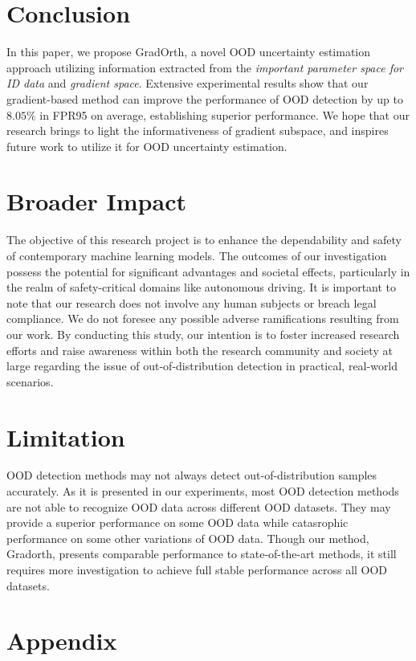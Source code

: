 \documentclass{article}
\begin{document}
\section{Conclusion}\vspace{-3mm}
In this paper, we propose GradOrth, a novel OOD uncertainty estimation approach utilizing information extracted from the \textit{important parameter space for ID data} and \textit{gradient space}. 
Extensive experimental results show that our gradient-based method can improve the performance of OOD detection by up to  $8.05\%$ in FPR95 on average, establishing superior performance. 
We hope that our research brings to light the informativeness of gradient subspace, and inspires future work to utilize it for OOD uncertainty estimation.
\newpage


\newpage
\section*{Broader Impact}
  The objective of this research project is to enhance the dependability and safety of contemporary machine learning models. The outcomes of our investigation possess the potential for significant advantages and societal effects, particularly in the realm of safety-critical domains like autonomous driving. It is important to note that our research does not involve any human subjects or breach legal compliance. We do not foresee any possible adverse ramifications resulting from our work. By conducting this study, our intention is to foster increased research efforts and raise awareness within both the research community and society at large regarding the issue of out-of-distribution detection in practical, real-world scenarios.

\section*{Limitation}
OOD detection methods may not always detect out-of-distribution samples accurately.
As it is presented in our experiments, most OOD detection methods are not able to recognize OOD data across different OOD datasets. They may provide a superior performance on some OOD data while catasrophic performance on some other variations of OOD data. Though our method, Gradorth, presents comparable performance to state-of-the-art methods, it still requires more investigation to achieve full stable performance across all OOD datasets. 

\appendix
\onecolumn
\section*{Appendix}
\end{document}
